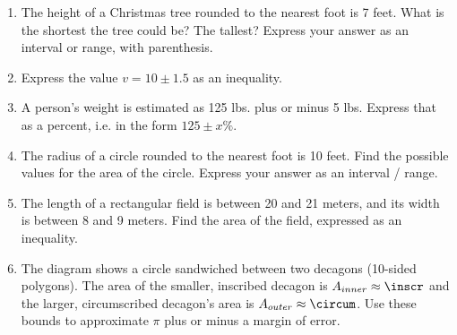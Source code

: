\begin{enumerate}
\item The height of a Christmas tree rounded to the nearest foot is 7 feet. What is the shortest the tree could be? The tallest? Express your answer as an interval or range, with parenthesis. \vspace{1cm}

\item Express the value $v=10 \pm 1.5$ as an inequality. \vspace{1cm}

\item A person's weight is estimated as 125 lbs. plus or minus 5 lbs. Express that as a percent, i.e. in the form $125 \pm x\%$. \vspace{2cm}

\item The radius of a circle rounded to the nearest foot is 10 feet. Find the possible values for the area of the circle. Express your answer as an interval / range. \vspace{3cm}

\item The length of a rectangular field is between 20 and 21 meters, and its width is between 8 and 9 meters. Find the area of the field, expressed as an inequality.

\newpage
\item The diagram shows a circle sandwiched between two decagons (10-sided polygons). The area of the smaller, inscribed decagon is $A_{inner} \approx \inscr$ and the larger, circumscribed decagon's area is $A_{outer} \approx \circum$. Use these bounds to approximate $\pi$ plus or minus a margin of error.
\par

    

\end{enumerate}
